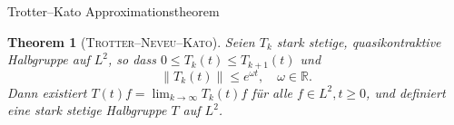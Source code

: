 \documentclass{beamer}
\newtheorem{thm}{Theorem}
\newtheorem{lem}[thm]{Lemma}
\theoremstyle{break}
\begin{document}
%

\begin{frame}{Trotter--Kato Approximationstheorem}
\begin{thm}[\textsc{Trotter--Neveu--Kato}]
Seien $T_k$ stark stetige, quasikontraktive Halbgruppe  auf $L^2$, so dass $0\le T_k(t) \le T_{k+1}(t)$ und
\begin{equation}
\|T_k(t)\|\le e^{\omega t},\quad \omega \in \mathbb R.
\end{equation}  
Dann existiert $T(t)f=\lim_{k\to \infty} T_k(t)f$ für alle $f\in L^2, t\ge 0$, und definiert eine stark stetige Halbgruppe $T$ auf $L^2$. 
\end{thm}
\end{frame}
\end{document}
